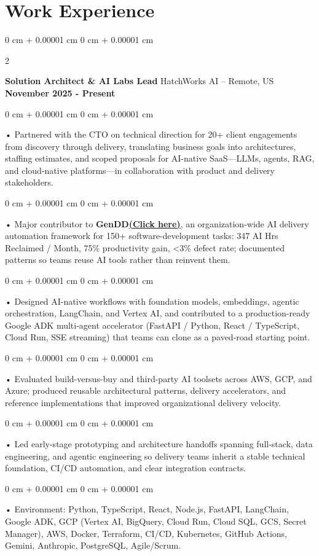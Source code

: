 \documentclass[10pt, letterpaper]{article}
\newenvironment{onecolentry}{
    \begin{adjustwidth}{
        0 cm + 0.00001 cm
    }{
        0 cm + 0.00001 cm
    }
}{
    \end{adjustwidth}
} %
\newenvironment{twocolentry}[2][]{
    \onecolentry
    \def\secondColumn{#2}
    \setcolumnwidth{\fill, 4.5 cm}
    \begin{paracol}{2}
}{
    \switchcolumn \raggedleft \secondColumn
    \end{paracol}
    \endonecolentry
} %
\begin{document}
    \vspace{0.5cm}
    \section{Work Experience}
        \vspace{0.1cm}

        \begin{twocolentry}{
            \textbf{November 2025 - Present}
        }
            \textbf{Solution Architect \& AI Labs Lead} HatchWorks AI -- Remote, US\end{twocolentry}

        \begin{onecolentry}
             • Partnered with the CTO on technical direction for 20+ client engagements from discovery through delivery, translating business goals into architectures, staffing estimates, and scoped proposals for AI-native SaaS---LLMs, agents, RAG, and cloud-native platforms---in collaboration with product and delivery stakeholders.
        \end{onecolentry}
        \begin{onecolentry}
             • Major contributor to \textbf{GenDD}\href{https://hatchworks.com/generative-driven-development/}{\textbf{(Click here)}}, an organization-wide AI delivery automation framework for 150+ software-development tasks: 347 AI Hrs Reclaimed / Month, 75\% productivity gain, {<}3\% defect rate; documented patterns so teams reuse AI tools rather than reinvent them.
        \end{onecolentry}
        \begin{onecolentry}
             • Designed AI-native workflows with foundation models, embeddings, agentic orchestration, LangChain, and Vertex AI, and contributed to a production-ready Google ADK multi-agent accelerator (FastAPI / Python, React / TypeScript, Cloud Run, SSE streaming) that teams can clone as a paved-road starting point.
        \end{onecolentry}
        \begin{onecolentry}
             • Evaluated build-versus-buy and third-party AI toolsets across AWS, GCP, and Azure; produced reusable architectural patterns, delivery accelerators, and reference implementations that improved organizational delivery velocity.
        \end{onecolentry}
        \begin{onecolentry}
             • Led early-stage prototyping and architecture handoffs spanning full-stack, data engineering, and agentic engineering so delivery teams inherit a stable technical foundation, CI/CD automation, and clear integration contracts.
        \end{onecolentry}
        \begin{onecolentry}
             • Environment: Python, TypeScript, React, Node.js, FastAPI, LangChain, Google ADK, GCP (Vertex AI, BigQuery, Cloud Run, Cloud SQL, GCS, Secret Manager), AWS, Docker, Terraform, CI/CD, Kubernetes, GitHub Actions, Gemini, Anthropic, PostgreSQL, Agile/Scrum.
        \end{onecolentry}
\end{document}
